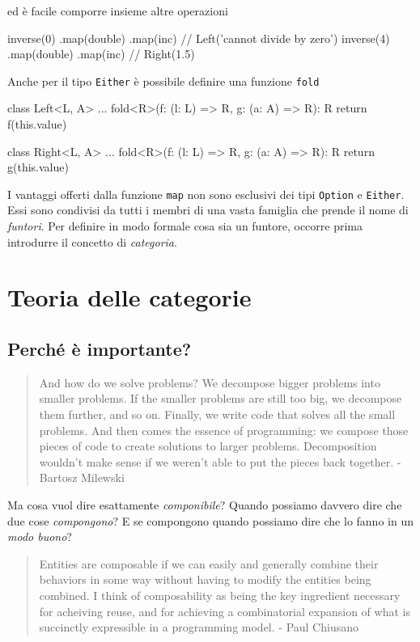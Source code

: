 \documentclass[12pt]{article}
\theoremstyle{definition}
\newenvironment{code}
  {\vspace{0.5cm} \VerbatimEnvironment\begin{typescriptcode}}
  {\end{typescriptcode} \vspace{0.2cm}}
\begin{document}
ed è facile comporre insieme altre operazioni

\begin{code}
inverse(0)
  .map(double)
  .map(inc) // Left('cannot divide by zero')
inverse(4)
  .map(double)
  .map(inc) // Right(1.5)
\end{code}

Anche per il tipo \texttt{Either} è possibile definire una funzione \texttt{fold}

\begin{code}
class Left<L, A> {
  ...
  fold<R>(f: (l: L) => R, g: (a: A) => R): R {
    return f(this.value)
  }
}

class Right<L, A> {
  ...
  fold<R>(f: (l: L) => R, g: (a: A) => R): R {
    return g(this.value)
  }
}
\end{code}

I vantaggi offerti dalla funzione \texttt{map} non sono esclusivi dei tipi \texttt{Option} e \texttt{Either}.
Essi sono condivisi da tutti i membri di una vasta famiglia che prende il nome di \emph{funtori}. Per definire in modo formale cosa sia un funtore,
occorre prima introdurre il concetto di \emph{categoria}.

\section{Teoria delle categorie}

\subsection{Perché è importante?}

\begin{quote}
And how do we solve problems? We decompose bigger problems into smaller problems. If the smaller problems are still too big,
we decompose them further, and so on. Finally, we write code that solves all the small problems.
And then comes the essence of programming: we compose those pieces of code to create solutions to larger problems.
Decomposition wouldn’t make sense if we weren’t able to put the pieces back together. - Bartosz Milewski
\end{quote}

Ma cosa vuol dire esattamente \emph{componibile}? Quando possiamo davvero dire che due cose \emph{compongono}?
E se compongono quando possiamo dire che lo fanno in un \emph{modo buono}?\\

\begin{quote}
Entities are composable if we can easily and generally combine their behaviors in some way without having to modify the entities being combined.
I think of composability as being the key ingredient necessary for acheiving reuse, and for achieving a combinatorial expansion of
what is succinctly expressible in a programming model. - Paul Chiusano
\end{quote}
\end{document}
